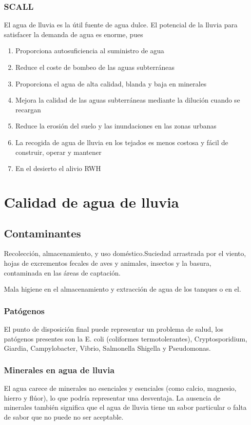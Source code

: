 \subsubsection{SCALL}
El agua de lluvia es la útil fuente de agua dulce. El potencial de la lluvia para satisfacer la demanda de agua es enorme, pues 
\begin{enumerate}
    \item Proporciona autosuficiencia al suministro de agua
    \item Reduce el coste de bombeo de las aguas subterráneas
    \item Proporciona el agua de alta calidad, blanda y baja en minerales
    \item Mejora la calidad de las aguas subterráneas mediante la dilución cuando se recargan
    \item Reduce la erosión del suelo y las inundaciones en las zonas urbanas
    \item La recogida de agua de lluvia en los tejados es menos costosa y fácil de construir, operar y mantener
    \item En el desierto el alivio RWH
\end{enumerate}

\section{Calidad de agua de lluvia}
\subsection{Contaminantes}
Recolección, almacenamiento, y uso doméstico.Suciedad arrastrada por el viento, hojas de excrementos fecales de aves y animales, insectos y la basura, contaminada en las áreas de captación.

Mala higiene en el almacenamiento y extracción de agua de los tanques o en el.

\subsubsection{Patógenos}
El punto de disposición final puede representar un problema de salud, los patógenos presentes son la E. coli (coliformes termotolerantes), Cryptosporidium, Giardia, Campylobacter, Vibrio, Salmonella Shigella y Pseudomonas.
\subsubsection{Minerales en agua de lluvia}
El agua carece de minerales no esenciales y esenciales (como calcio, magnesio, hierro y flúor), lo que podría representar una desventaja. La ausencia de minerales también significa que el agua de lluvia tiene un sabor particular o falta de sabor que no puede no ser aceptable.

